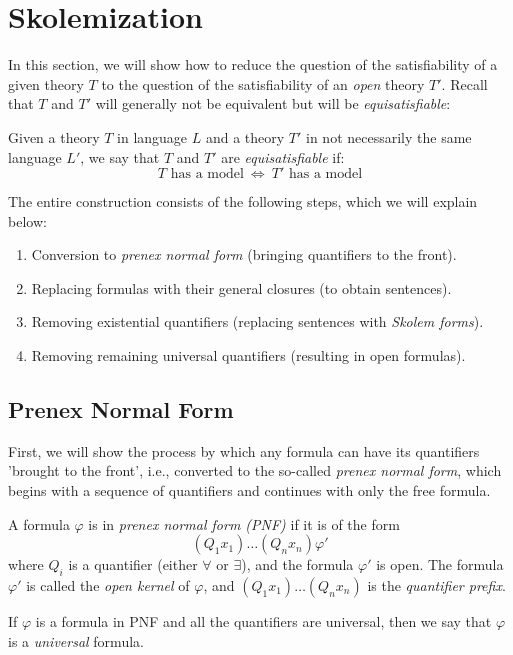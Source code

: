 \section{Skolemization}\label{section:skolemization}

In this section, we will show how to reduce the question of the satisfiability of a given theory $T$ to the question of the satisfiability of an \emph{open} theory $T'$. Recall that $T$ and $T'$ will generally not be equivalent but will be \emph{equisatisfiable}:

\begin{definition}[Equisatisfiability]
Given a theory $T$ in language $L$ and a theory $T'$ in not necessarily the same language $L'$, we say that $T$ and $T'$ are \emph{equisatisfiable} if:
$$
\text{$T$ has a model}\ \Leftrightarrow\ \text{$T'$ has a model}
$$
\end{definition}

The entire construction consists of the following steps, which we will explain below:
\begin{enumerate}
    \item Conversion to \emph{prenex normal form} (bringing quantifiers to the front).
    \item Replacing formulas with their general closures (to obtain sentences).
    \item Removing existential quantifiers (replacing sentences with \emph{Skolem forms}).
    \item Removing remaining universal quantifiers (resulting in open formulas).
\end{enumerate}

\subsection{Prenex Normal Form}

First, we will show the process by which any formula can have its quantifiers 'brought to the front', i.e., converted to the so-called \emph{prenex normal form}, which begins with a sequence of quantifiers and continues with only the free formula.

\begin{definition}[PNF]
    A formula $\varphi$ is in \emph{prenex normal form (PNF)} if it is of the form
    $$
    (Q_1x_1)\dots(Q_nx_n)\varphi'
    $$
    where $Q_i$ is a quantifier (either $\forall$ or $\exists$), and the formula $\varphi'$ is open. The formula $\varphi'$ is called the \emph{open kernel} of $\varphi$, and $(Q_1x_1)\dots(Q_nx_n)$ is the \emph{quantifier prefix}. 
    
    If $\varphi$ is a formula in PNF and all the quantifiers are universal, then we say that $\varphi$ is a \emph{universal} formula.
\end{definition}

